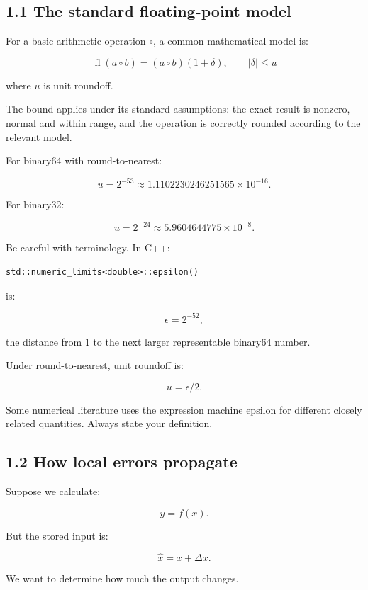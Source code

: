 \subsection{1.1 The standard floating-point model}\label{02-foundations-ii-ch028-the-standard-floating-point-model}

For a basic arithmetic operation \(\circ\), a common mathematical model is:

\[ \boxed{ \operatorname{fl}(a\circ b) = (a\circ b)(1+\delta), \qquad |\delta|\le u } \]

where \(u\) is unit roundoff.

The bound applies under its standard assumptions: the exact result is nonzero, normal and within range, and the operation is correctly rounded according to the relevant model.

For binary64 with round-to-nearest:

\[ \boxed{u=2^{-53}\approx1.1102230246251565\times10^{-16}}. \]

For binary32:

\[ \boxed{u=2^{-24}\approx5.9604644775\times10^{-8}}. \]

Be careful with terminology. In C++:

\begin{verbatim}
std::numeric_limits<double>::epsilon()
\end{verbatim}

is:

\[ \boxed{\epsilon=2^{-52}}, \]

the distance from 1 to the next larger representable binary64 number.

Under round-to-nearest, unit roundoff is:

\[ u=\epsilon/2. \]

Some numerical literature uses the expression machine epsilon for different closely related quantities. Always state your definition.

\subsection{1.2 How local errors propagate}\label{02-foundations-ii-ch028-how-local-errors-propagate}

Suppose we calculate:

\[ y=f(x). \]

But the stored input is:

\[ \hat x=x+\Delta x. \]

We want to determine how much the output changes.


